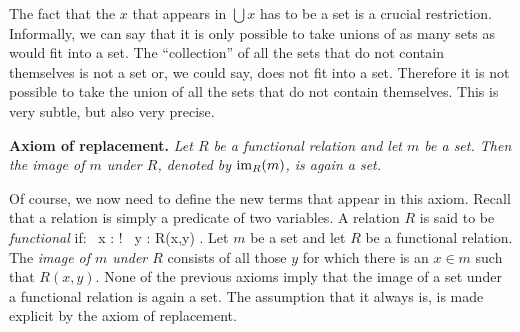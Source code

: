 \br
The fact that the $x$ that appears in $\bigcup x$ has to be a set is a crucial
restriction. Informally, we can say that it is only possible to take unions of
as many sets as would fit into a set. The ``collection'' of all the sets that
do not contain themselves is not a set or, we could say, does not fit into a
set. Therefore it is not possible to take the union of all the sets that do
not contain themselves. This is very subtle, but also very precise.
\er

\textbf{Axiom of replacement.} \emph{Let $R$ be a
functional relation and let $m$ be a set. Then the image of $m$ under $R$,
denoted by $\mathrm{im}_R (m)$, is again a set.}

Of course, we now need to define the new terms that appear in this axiom.
Recall that a relation is simply a predicate of two variables.
\bd
A relation $R$ is said to be \emph{functional} if:
\bse
\forall \, x : \exists ! \, y : R(x,y) .
\ese
\ed
\bd
Let $m$ be a set and let $R$ be a functional relation. The \emph{image of $m$
under $R$} consists of all those $y$ for which there is an $x\in
m$ such that $R(x,y)$. 
\ed
None of the previous axioms imply that the image of a set under a functional
relation is again a set. The assumption that it always is, is made explicit by
the axiom of replacement.

